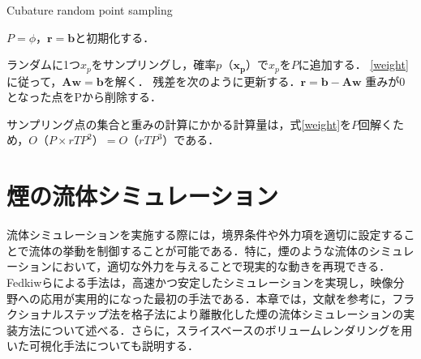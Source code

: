 \documentclass[a4j,12pt]{jreport}
\begin{document}
\begin{algorithm}[H]
    	\caption{Cubature random point sampling}
	\label{alg1}
        	\begin{algorithmic}[1]
		\STATE $P = \phi$，$\bm{r} = \bm{b}$と初期化する．                
		
			\STATE ランダムに1つ$x_p$をサンプリングし，確率$p（\bm{x_p}）$で$x_p$を$P$に追加する．
			\STATE \ref{weight}に従って，$\mathbf{A}\bm{w} = \bm{b}$を解く．
			\STATE 残差を次のように更新する．$\bm{r} = \bm{b} - \mathbf{A}\bm{w}$
			\STATE 重みが0となった点をPから削除する．
		\ENDWHILE
        \end{algorithmic}
\end{algorithm}

サンプリング点の集合と重みの計算にかかる計算量は，式\ref{weight}を$P$回解くため，$O（P\times rTP^2） = O（rTP^3）$である．
\chapter{煙の流体シミュレーション}
流体シミュレーションを実施する際には，境界条件や外力項を適切に設定することで流体の挙動を制御することが可能である．特に，煙のような流体のシミュレーションにおいて，適切な外力を与えることで現実的な動きを再現できる．Fedkiwらによる手法\cite{fedkiw}は，高速かつ安定したシミュレーションを実現し，映像分野への応用が実用的になった最初の手法である．本章では，文献\cite{fedkiw}を参考に，フラクショナルステップ法を格子法により離散化した煙の流体シミュレーションの実装方法について述べる．さらに，スライスベースのボリュームレンダリングを用いた可視化手法についても説明する．%
\end{document}
